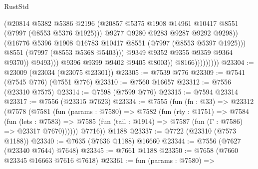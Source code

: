 \begin{lexlean}{RustStd}
\begin{coremodule}
                                        (@20814
                                          @5382
                                          @5386
                                          @2196
                                          (@20857
                                            @5375
                                            @1908
                                            @14961
                                            @10417
                                            @8551
                                            (@7997 (@8553 @5376 @1925)))
                                          @9277
                                          @9280
                                          @9283
                                          @9287
                                          @9292
                                          @9298))
                                      (@16776
                                        @5396
                                        @1908
                                        @16783
                                        @10417
                                        @8551
                                        (@7997 (@8553 @5397 @1925)))
                                      @8551
                                      (@7997 (@8553 @5368 @5403)))
                                    @9349
                                    @9352
                                    @9355
                                    @9359
                                    @9364
                                    @9370))
                                @9493)))
                          @9396
                          @9399
                          @9402
                          @9405
                          @8003))
                      @8166)))))))))
@23304 := @23009 (@23034 (@23075 @23301))
@23305 := @7539 @776
@23309 := @7541 (@7545 @776) (@7551 @776)
@23310 := @7560 @16657
@23312 := @7556 (@23310 @7575)
@23314 := @7598 (@7599 @776)
@23315 := @7594 @23314
@23317 := @7556 (@23315 @7623)
@23334 := @7555
    (fun (fn : @33) =>
    @23312
      (@7578
        (@7581
          (fun (params : @7580) =>
          @7582
            (fun (rty : @1751) =>
            @7584
              (fun (lets : @7583) =>
              @7585 (fun (tail : @1914) => @7587 (fun (Γ : @7586) => @23317 @7670))))))
        @7716))
    @1188
@23337 := @7722 (@23310 (@7573 @1188))
@23340 := @7635 (@7636 @1188) @16660
@23344 := @7556 (@7627 (@23340 @7644) @7648)
@23345 := @7661 @1188
@23350 := @7658 (@7660 @23345 @16663 @7616 @7618)
@23361 := fun (params : @7580) =>

\end{coremodule}
\end{lexlean}
